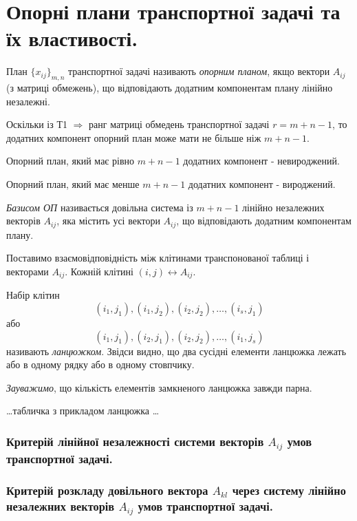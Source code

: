 \documentclass[12pt,a4paper]{report}
\newenvironment{slim_itemize}{
\begin{itemize}
  \setlength{\itemsep}{1pt}
  \setlength{\parskip}{0pt}
  \setlength{\parsep}{0pt}}
{\end{itemize}}
\begin{document}
\clearpage

\chapter{Опорні плани транспортної задачі та їх властивості.}

План $\{x_{ij}\}_{m,n}$ транспортної задачі називають \emph{опорним планом}, якщо вектори $A_{ij}$ (з матриці обмежень), що відповідають додатним компонентам плану лінійно незалежні.

Оскільки із Т1 $\Rightarrow$ ранг матриці обмедень транспортної задачі $r=m+n-1$, то додатних компонент опорний план може мати не більше ніж $m+n-1$.

\begin{slim_itemize}
  \item Опорний план, який має рівно $m+n-1$ додатних компонент - невироджений.
  \item Опорний план, який має менше $m+n-1$ додатних компонент - вироджений.
\end{slim_itemize}

\emph{Базисом ОП} називається довільна система із $m+n-1$ лінійно незалежних векторів $A_{ij}$, яка містить усі вектори $A_{ij}$, що відповідають додатним компонентам плану.

Поставимо взаємовідповідність між клітинами транспонованої таблиці і векторами $A_{ij}$. Кожній клітині $(i,j) \leftrightarrow A_{ij}$.

Набір клітин $$(i_1,j_1),(i_1,j_2),(i_2,j_2),\dots,(i_s,j_1)$$або$$(i_1,j_1),(i_2,j_1),(i_2,j_2),\dots,(i_1,j_s)$$
називають \emph{ланцюжком}. Звідси видно, що два сусідні елементи ланцюжка лежать або в одному рядку або в одному стовпчику.

\emph{Зауважимо}, що кількість елементів замкненого ланцюжка завжди парна.

\dots табличка з прикладом ланцюжка \dots

\subsection{Критерій лінійної незалежності системи векторів $A_{ij}$ умов транспортної задачі.}

\subsection{Критерій розкладу довільного вектора $A_{kl}$ через систему лінійно незалежних векторів $A_{ij}$ умов транспортної задачі.}
\end{document}
